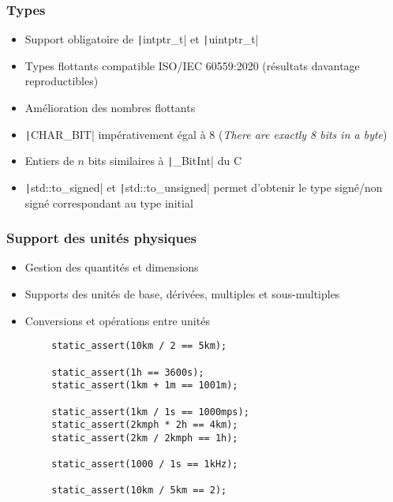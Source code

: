 \documentclass[C++.tex]{subfiles}
\begin{document}
\begin{frame}[fragile]
	\frametitle{Types}
	\begin{itemize}
		\item Support obligatoire de \texttt|intptr_t| et \texttt|uintptr_t|
		\item Types flottants compatible ISO/IEC 60559:2020 (résultats davantage reproductibles)
		\item Amélioration des nombres flottants
		\item \texttt|CHAR_BIT| impérativement égal à 8 (\textit{\og{}There are exactly 8 bits in a byte\fg{}})


		\item Entiers de $n$ bits similaires à \texttt|_BitInt| du C
		\item \texttt|std::to_signed| et \texttt|std::to_unsigned| permet d'obtenir le type signé/non signé correspondant au type initial
	\end{itemize}

\end{frame}

\begin{frame}[fragile]
	\frametitle{Support des unités physiques}
	\begin{itemize}
		\item Gestion des quantités et dimensions
		\item Supports des unités de base, dérivées, multiples et sous-multiples
		\item Conversions et opérations entre unités
	\end{itemize}

	\begin{verbatim}
		static_assert(10km / 2 == 5km);

		static_assert(1h == 3600s);
		static_assert(1km + 1m == 1001m);

		static_assert(1km / 1s == 1000mps);
		static_assert(2kmph * 2h == 4km);
		static_assert(2km / 2kmph == 1h);

		static_assert(1000 / 1s == 1kHz);

		static_assert(10km / 5km == 2);
	\end{verbatim}

\end{frame}
\end{document}
